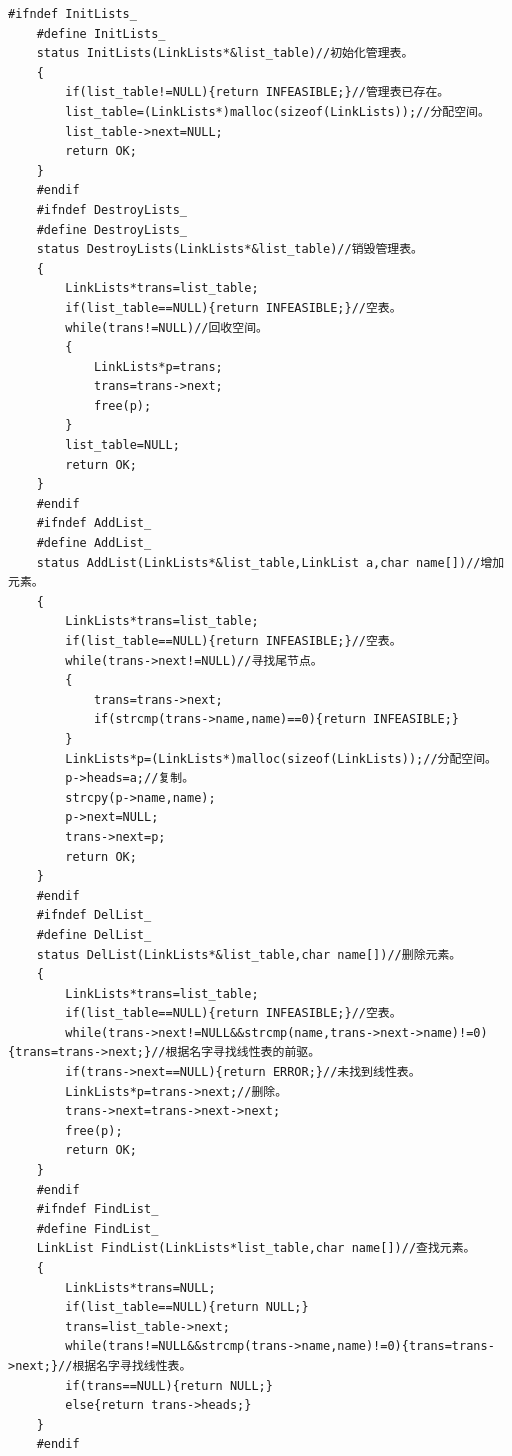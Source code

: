 \documentclass[supercite]{Experimental_Report}
\theoremstyle{definition}
\begin{document}
\begin{lstlisting}[title==多链表管理,frame=none]
	#ifndef InitLists_
	#define InitLists_
	status InitLists(LinkLists*&list_table)//初始化管理表。 
	{
		if(list_table!=NULL){return INFEASIBLE;}//管理表已存在。 
		list_table=(LinkLists*)malloc(sizeof(LinkLists));//分配空间。 
		list_table->next=NULL;
		return OK;
	}
	#endif
	#ifndef DestroyLists_
	#define DestroyLists_
	status DestroyLists(LinkLists*&list_table)//销毁管理表。 
	{
		LinkLists*trans=list_table;
		if(list_table==NULL){return INFEASIBLE;}//空表。 
		while(trans!=NULL)//回收空间。 
		{
			LinkLists*p=trans;
			trans=trans->next;
			free(p);
		}
		list_table=NULL;
		return OK;
	}
	#endif
	#ifndef AddList_
	#define AddList_
	status AddList(LinkLists*&list_table,LinkList a,char name[])//增加元素。 
	{
		LinkLists*trans=list_table;
		if(list_table==NULL){return INFEASIBLE;}//空表。 
		while(trans->next!=NULL)//寻找尾节点。 
		{
			trans=trans->next;
			if(strcmp(trans->name,name)==0){return INFEASIBLE;}
		}
		LinkLists*p=(LinkLists*)malloc(sizeof(LinkLists));//分配空间。 
		p->heads=a;//复制。 
		strcpy(p->name,name);
		p->next=NULL;
		trans->next=p;
		return OK;
	}
	#endif
	#ifndef DelList_
	#define DelList_
	status DelList(LinkLists*&list_table,char name[])//删除元素。 
	{
		LinkLists*trans=list_table;
		if(list_table==NULL){return INFEASIBLE;}//空表。 
		while(trans->next!=NULL&&strcmp(name,trans->next->name)!=0){trans=trans->next;}//根据名字寻找线性表的前驱。 
		if(trans->next==NULL){return ERROR;}//未找到线性表。 
		LinkLists*p=trans->next;//删除。 
		trans->next=trans->next->next;
		free(p);
		return OK;
	}
	#endif
	#ifndef FindList_
	#define FindList_
	LinkList FindList(LinkLists*list_table,char name[])//查找元素。 
	{
		LinkLists*trans=NULL;
		if(list_table==NULL){return NULL;}
		trans=list_table->next;
		while(trans!=NULL&&strcmp(trans->name,name)!=0){trans=trans->next;}//根据名字寻找线性表。 
		if(trans==NULL){return NULL;}
		else{return trans->heads;}
	}
	#endif
\end{lstlisting}
\newpage
\end{document}
